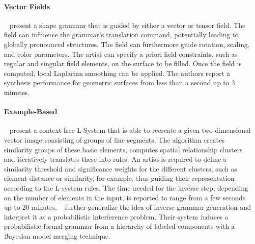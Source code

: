 \paragraph*{Vector Fields}
\label{para:analysis_rulebased_vector_fields}

\citeauthor*{yuanyuan_2011_gso}~\cite{yuanyuan_2011_gso} present a shape grammar that is guided by either a vector or tensor field. The field can influence the grammar's translation command, potentially leading to globally pronounced structures. The field can furthermore guide rotation, scaling, and color parameters. The artist can specify a priori field constraints, such as regular and singular field elements, on the surface to be filled. Once the field is computed, local Laplacian smoothing can be applied. The authors report a synthesis performance for geometric surfaces from less than a second up to 3 minutes.
\paragraph*{Example-Based}
\label{para:analysis_rulebased_example}
\citeauthor*{stava_2010_ipm}~\cite{stava_2010_ipm} present a context-free L-System that is able to recreate a given two-dimensional vector image consisting of groups of line segments. The algorithm creates similarity groups of these basic elements, computes spatial relationship clusters and iteratively translates these into rules. An artist is required to define a similarity threshold and significance weights for the different clusters, such as element distance or similarity, for example, thus guiding their representation according to the L-system rules. The time needed for the inverse step, depending on the number of elements in the input, is reported to range from a few seconds up to 20 minutes. \citeauthor*{talton_2012_ldp}~\cite{talton_2012_ldp} further generalize the idea of inverse grammar generation and interpret it as a probabilistic interference problem. Their system induces a probabilistic formal grammar from a hierarchy of labeled components with a Bayesian model merging technique.


